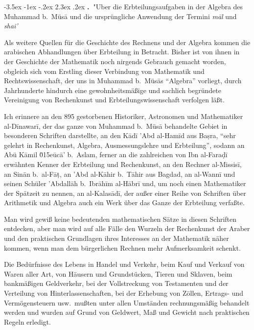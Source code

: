 \documentclass[11pt,a4paper]{article}
\makeatletter
\renewcommand{\section}{\@startsection{section}{1}{\z@}%
  {-3.5ex \@plus -1ex \@minus -.2ex}%
  {2.3ex \@plus .2ex}%
  {\normalfont\Large\bfseries\color{sectioncolor}\thesection.\ }}
\newcommand{\enquote}[1]{``#1''}
\makeatother
\begin{document}
\clearpage

\section{"Uber die Erbteilungsaufgaben in der Algebra des Muhammad b.\ M\"us\=a und die urspr\"ungliche Anwendung der Termini \textit{m\=al} und \textit{shai'}}

Als weitere Quellen f\"ur die Geschichte des Rechnens und der Algebra kommen die arabischen Abhandlungen \"uber Erbteilung in Betracht. Bisher ist von ihnen in der Geschichte der Mathematik noch nirgends Gebrauch gemacht worden, obgleich sich vom Erstling dieser Verbindung von Mathematik und Rechtswissenschaft, der uns in Muhammad b.\ M\"us\=as \enquote{Algebra} vorliegt, durch Jahrhunderte hindurch eine gewohnheitsm\"a\ss{}ige und sachlich begr\"undete Vereinigung von Rechenkunst und Erbteilungswissenschaft verfolgen l\"a\ss{}t.

Ich erinnere an den 895 gestorbenen Historiker, Astronomen und Mathematiker al-D\={i}nawar\={i}, der das ganze von Muhammad b.\ M\"us\=a behandelte Gebiet in besonderen Schriften darstellte, an den K\=ad\={i} 'Abd al-Ham\={i}d aus Ba\d{s}ra, \enquote{sehr gelehrt in Rechenkunst, Algebra, Ausmessungslehre und Erbteilung}, sodann an Ab\"u K\=amil \u015e\=uc\=a' b.\ Aslam, ferner an die zahlreichen von Ibn al-Fara\d{d}\={i} erw\"ahnten Kenner der Erbteilung und Rechenkunst, an den Rechner al-Missis\={i}, an Sin\=an b.\ al-F\=a\d{t}, an 'Abd al-K\=ahir b.\ T\=ahir aus Bagdad, an al-Wann\={i} und seinen Sch\"uler 'Abdall\=ah b.\ Ibr\=ah\={i}m al-H\=abr\={i} und, um noch einen Mathematiker der Sp\"atzeit zu nennen, an al-Kalas\=ad\={i}, der au\ss{}er einer Reihe von Schriften \"uber Arithmetik und Algebra auch ein Werk \"uber das Ganze der Erbteilung verfa\ss{}te.

Man wird gewi\ss{} keine bedeutenden mathematischen S\"atze in diesen Schriften entdecken, aber man wird auf alle F\"alle den Wurzeln der Rechenkunst der Araber und den praktischen Grundlagen ihres Interesses an der Mathematik n\"aher kommen, wenn man dem b\"urgerlichen Rechnen mehr Aufmerksamkeit schenkt.

Die Bed\"urfnisse des Lebens in Handel und Verkehr, beim Kauf und Verkauf von Waren aller Art, von H\"ausern und Grundst\"ucken, Tieren und Sklaven, beim bankm\"a\ss{}igen Geldverkehr, bei der Vollstreckung von Testamenten und der Verteilung von Hinterlassenschaften, bei der Erhebung von Z\"ollen, Ertrags- und Verm\"ogensteuern usw.\ mu\ss{}ten unter allen Umst\"anden rechnungsm\"a\ss{}ig behandelt werden und wurden auf Grund von Geldwert, Ma\ss{} und Gewicht nach praktischen Regeln erledigt.
\end{document}
